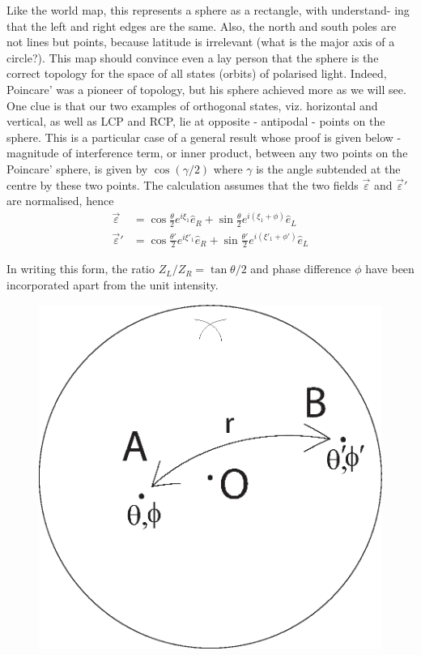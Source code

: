 Like the world map, this represents a sphere as a rectangle, with understand-
ing that the left and right edges are the same. Also, the north and south poles
are not lines but points, because latitude is irrelevant (what is the major axis of
a circle?). This map should convince even a lay person that the sphere is the
correct topology for the space of all states (orbits) of polarised light. Indeed,
Poincare’ was a pioneer of topology, but his sphere achieved more as we will
see. One clue is that our two examples of orthogonal states, viz. horizontal and
vertical, as well as LCP and RCP, lie at opposite - antipodal - points on the
sphere. This is a particular case of a general result whose proof is given below
- magnitude of interference term, or inner product, between any two points on
the Poincare' sphere, is given by $\cos(\gamma/2)$ where $\gamma$ is the angle subtended at the
centre by these two points. The calculation assumes that the two fields $\overrightarrow{\varepsilon}$ and
$\overrightarrow{\varepsilon}'$ are normalised, hence
\begin{align*}
\overrightarrow{\varepsilon} & = \cos \frac{\theta}{2} e^{i \xi_1} \hat{e}_R + \sin \frac{\theta}{2} e^{i(\xi_1+ \phi)} \hat{e}_L\\
\overrightarrow{\varepsilon}' & = \cos \frac{\theta'}{2} e^{i \xi'_1} \hat{e}_R + \sin \frac{\theta'}{2} e^{i (\xi'_1 + \phi')} \hat{e}_L
\end{align*}

In writing this form, the ratio $Z_L /Z_R = \tan \theta/2$ and phase difference $\phi$ have
been incorporated apart from the unit intensity.
\begin{figure}[H]
\centering
\includegraphics[scale=0.2]{src/images/chap26/7.jpg}
\end{figure}

